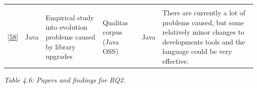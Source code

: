 \documentclass[]{book}
\begin{document}
\begin{longtable}[]{@{}llllll@{}}
\begin{minipage}[t]{0.11\columnwidth}
\end{minipage}\tabularnewline
\begin{minipage}[t]{0.10\columnwidth}\raggedright\strut
{[}\protect\hyperlink{ref-Dietrich2014}{58}{]}\strut
\end{minipage} & \begin{minipage}[t]{0.18\columnwidth}\raggedright\strut
Java\strut
\end{minipage} & \begin{minipage}[t]{0.19\columnwidth}\raggedright\strut
Empirical study into evolution problems caused by library upgrades\strut
\end{minipage} & \begin{minipage}[t]{0.11\columnwidth}\raggedright\strut
Qualitas corpus (Java OSS)\strut
\end{minipage} & \begin{minipage}[t]{0.13\columnwidth}\raggedright\strut
Java\strut
\end{minipage} & \begin{minipage}[t]{0.11\columnwidth}\raggedright\strut
There are currently a lot of problems caused, but some relatively minor
changes to developments tools and the language could be very
effective.\strut
\end{minipage}\tabularnewline
\bottomrule
\end{longtable}

\emph{Table 4.6: Papers and findings for RQ2.}
\end{document}
